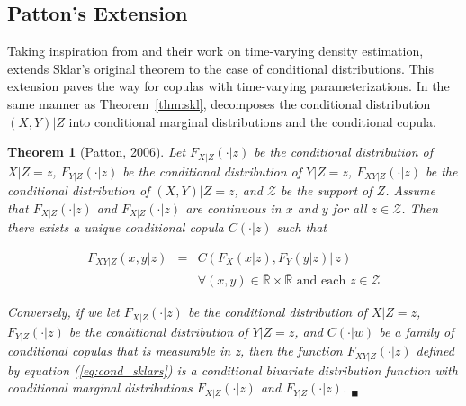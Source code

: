 \documentclass[12pt]{article}
\newtheorem{thm}{Theorem}
\begin{document}
\subsection{Patton's Extension}

Taking inspiration from \cite{Hansen_1994} and their work on time-varying density estimation, \cite{Patton_2006} extends Sklar's original theorem to the case of conditional distributions. This extension paves the way for copulas with time-varying parameterizations. In the same manner as Theorem~\ref{thm:skl}, \cite{Patton_2006} decomposes the conditional distribution $\left(X,Y\right) | Z$ into conditional marginal distributions and the conditional copula.


\begin{thm}[Patton, 2006] \label{thm:cond_skl}
	Let $F_{X|Z}(\cdot|z)$ be the conditional distribution of $X|Z=z$, $F_{Y|Z}(\cdot|z)$ be the conditional distribution of $Y|Z=z$, $F_{XY|Z}(\cdot|z)$ be the conditional distribution of $(X, Y)|Z = z$, and $\mathcal{Z}$ be the support of $Z$. Assume that $F_{X|Z}(\cdot|z)$ and $F_{X|Z}(\cdot|z)$ are continuous in $x$ and $y$ for all $z \in \mathcal{Z}$. Then there exists a unique conditional copula $C(\cdot|z)$ such that

	\begin{eqnarray}
		F_{XY|Z}\left(x,y|z\right) & = & C\left(F_{X}\left(x|z\right), F_{Y}\left(y|z\right)|\,z\right)  \label{eq:cond_sklars} \\
		 & &\forall(x, y) \in \bar{\mathbb{R}} \times \bar{\mathbb{R}} \text{ and each } z \in \mathcal{Z} \nonumber
	\end{eqnarray}

	Conversely, if we let $F_{X|Z}(\cdot|z)$ be the conditional distribution of $X|Z=z$, $F_{Y|Z}(\cdot|z)$ be the conditional distribution of $Y|Z=z$, and {$C(\cdot|w)$} be a family of conditional copulas that is measurable in z, then the function $F_{XY|Z}(\cdot|z)$ defined by equation (\ref{eq:cond_sklars}) is a conditional bivariate distribution function with conditional marginal distributions $F_{X|Z}(\cdot|z)$ and $F_{Y|Z}(\cdot|z)$.  $_{\blacksquare}$
\end{thm}
\end{document}

